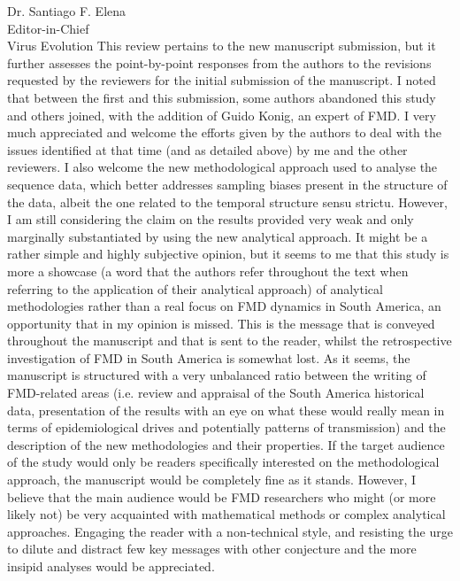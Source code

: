\documentclass[12pt, a4paper]{letter} %
\begin{document}
\begin{letter}{
	Dr. Santiago F. Elena\\
    Editor-in-Chief \\
    Virus Evolution
}
This review pertains to the new manuscript submission, but it further assesses the point-by-point responses from the authors to the revisions requested by the reviewers for the initial submission of the manuscript.
I noted that between the first and this submission, some authors abandoned this study and others joined, with the addition of Guido Konig, an expert of FMD.
I very much appreciated and welcome the efforts given by the authors to deal with the issues identified at that time (and as detailed above) by me and the other reviewers.
I also welcome the new methodological approach used to analyse the sequence data, which better addresses sampling biases present in the structure of the data, albeit the one related to the temporal structure sensu strictu.
However, I am still considering the claim on the results provided very weak and only marginally substantiated by using the new analytical approach.
It might be a rather simple and highly subjective opinion, but it seems to me that this study is more a showcase (a word that the authors refer throughout the text when referring to the application of their analytical approach) of analytical methodologies rather than a real focus on FMD dynamics in South America, an opportunity that in my opinion is missed.
This is the message that is conveyed throughout the manuscript and that is sent to the reader, whilst the retrospective investigation of FMD in South America is somewhat lost.
As it seems, the manuscript is structured with a very unbalanced ratio between the writing of FMD-related areas (i.e. review and appraisal of the South America historical data, presentation of the results with an eye on what these would really mean in terms of epidemiological drives and potentially patterns of transmission) and the description of the new methodologies and their properties.
If the target audience of the study would only be readers specifically interested on the methodological approach, the manuscript would be completely fine as it stands.
However, I believe that the main audience would be FMD researchers who might (or more likely not) be very acquainted with mathematical methods or complex analytical approaches.
Engaging the reader with a non-technical style, and resisting the urge to dilute and distract few key messages with other conjecture and the more insipid analyses would be appreciated.


\end{letter}
\end{document}
